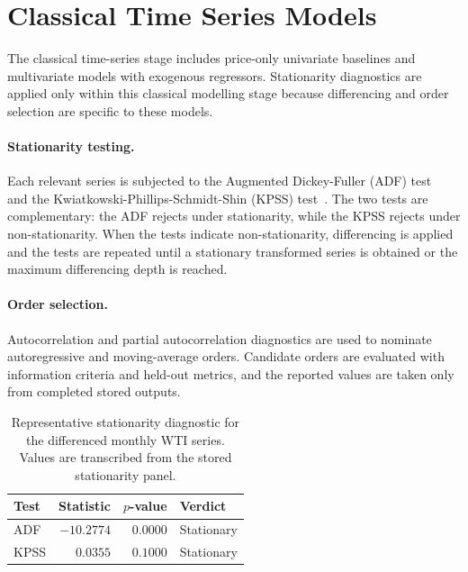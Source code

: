 \documentclass[11pt,a4paper]{article}
\begin{document}
\section{Classical Time Series Models}\label{sec:classical}

The classical time-series stage includes price-only univariate baselines and multivariate models with exogenous regressors. Stationarity diagnostics are applied only within this classical modelling stage because differencing and order selection are specific to these models.

\paragraph{Stationarity testing.} Each relevant series is subjected to the Augmented Dickey-Fuller (ADF) test~\citep{dickey1979distribution} and the Kwiatkowski-Phillips-Schmidt-Shin (KPSS) test~\citep{kwiatkowski1992testing}. The two tests are complementary: the ADF rejects under stationarity, while the KPSS rejects under non-stationarity. When the tests indicate non-stationarity, differencing is applied and the tests are repeated until a stationary transformed series is obtained or the maximum differencing depth is reached.

\paragraph{Order selection.} Autocorrelation and partial autocorrelation diagnostics are used to nominate autoregressive and moving-average orders. Candidate orders are evaluated with information criteria and held-out metrics, and the reported values are taken only from completed stored outputs.

\begin{table}[h!]
\centering
\caption{Representative stationarity diagnostic for the differenced monthly WTI series. Values are transcribed from the stored stationarity panel.}\label{tab:stationarity}
\small
\begin{tabular}{@{}lrrl@{}}
\toprule
Test & Statistic & $p$-value & Verdict\\
\midrule
ADF  & $-10.2774$ & $0.0000$ & Stationary\\
KPSS & $0.0355$  & $0.1000$ & Stationary\\
\bottomrule
\end{tabular}
\end{table}
\end{document}
